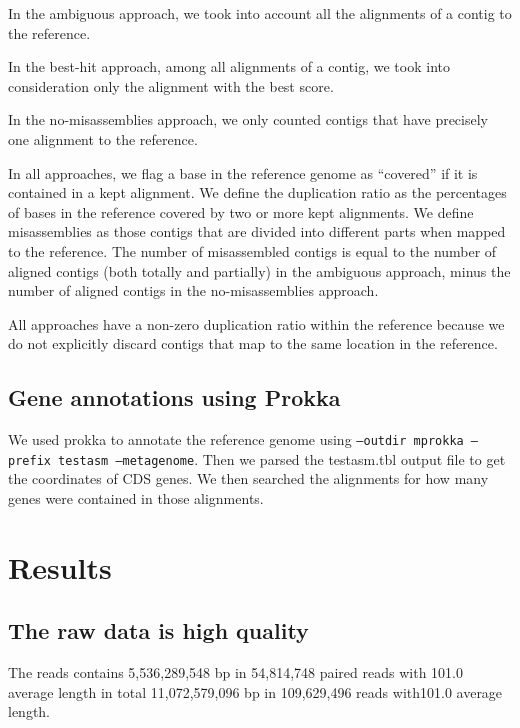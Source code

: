 \documentclass[10pt,a4paper,twocolumn]{article}
\begin{document}
In the ambiguous approach, we took into account all the alignments of
a contig to the reference.

In the best-hit approach, among all alignments of a contig, we took
into consideration only the alignment with the best score.

In the no-misassemblies approach, we only counted contigs that have
precisely one alignment to the reference.

In all approaches, we flag a base in the reference genome as
``covered'' if it is contained in a kept alignment.  We define the
duplication ratio as the percentages of bases in the reference covered
by two or more kept alignments. We define misassemblies as
those contigs that are divided into different parts when mapped to the
reference.  The number of misassembled contigs is equal to the number
of aligned contigs (both totally and partially) in the ambiguous
approach, minus the number of aligned contigs in the no-misassemblies
approach.


All approaches have a non-zero duplication ratio within the reference
because we do not explicitly discard contigs that map to the same
location in the reference.


\subsection*{Gene annotations using Prokka}
We used prokka \cite{prokka} to annotate the reference genome using
{\tt{--outdir mprokka --prefix testasm --metagenome}}. Then we parsed
the testasm.tbl output file to get the coordinates of CDS genes. We then
searched the alignments for how many genes were contained in those
alignments.

\section*{Results}

\subsection*{The raw data is high quality}


The reads contains 5,536,289,548 bp in  54,814,748 paired reads with 101.0 average length in total 11,072,579,096 bp  in 109,629,496 reads with101.0 average length.
\end{document}

